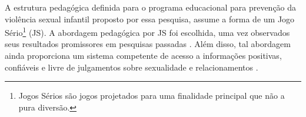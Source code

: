 A estrutura pedagógica definida para o programa educacional para prevenção da violência sexual infantil proposto por essa pesquisa, assume a forma de um Jogo Sério\footnote{Jogos Sérios são jogos projetados para uma finalidade principal que não a pura diversão.} (JS). A abordagem pedagógica por JS foi escolhida, uma vez observados seus resultados promissores em pesquisas passadas \cite{muller2014child, fingerleabschlussbericht}. Além disso, tal abordagem ainda proporciona um sistema competente de acesso a informações positivas, confiáveis e livre de julgamentos sobre sexualidade e relacionamentos \cite{women2018international}.





